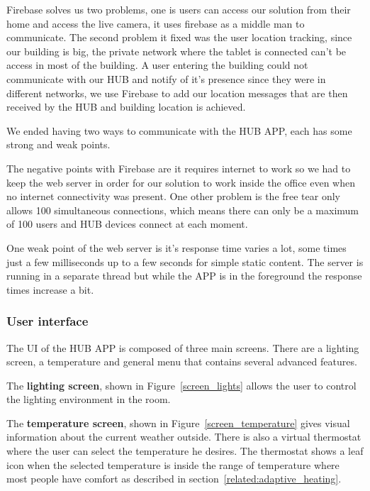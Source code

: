 Firebase solves us two problems, one is users can access our solution from their home and access the live camera, it uses firebase as a middle man to communicate. The second problem it fixed was the user location tracking, since our building is big, the private network where the tablet is connected can't be access in most of the building. A user entering the building could not communicate with our HUB and notify of it's presence since they were in different networks, we use Firebase to add our location messages that are then received by the HUB and building location is achieved.

We ended having two ways to communicate with the HUB APP, each has some strong and weak points. 

The negative points with Firebase are it requires internet to work so we had to keep the web server in order for our solution to work inside the office even when no internet connectivity was present. One other problem is the free tear only allows 100 simultaneous connections, which means there can only be a maximum of 100 users and HUB devices connect at each moment.

One weak point of the web server is it's response time varies a lot, some times just a few milliseconds up to a few seconds for simple static content. The server is running in a separate thread but while the APP is in the foreground the response times increase a bit.



\subsubsection{User interface}


The \ac{UI} of the HUB APP is composed of three main screens. There are a lighting screen, a temperature and general menu that contains several advanced features.

The \textbf{lighting screen}, shown in Figure~\ref{screen_lights} allows the user to control the lighting environment in the room.

The \textbf{temperature screen}, shown in Figure~\ref{screen_temperature} gives visual information about the current weather outside. There is also a virtual thermostat where the user can select the temperature he desires. The thermostat shows a leaf icon when the selected temperature is inside the range of temperature where most people have comfort as described in section~\ref{related:adaptive_heating}. 

